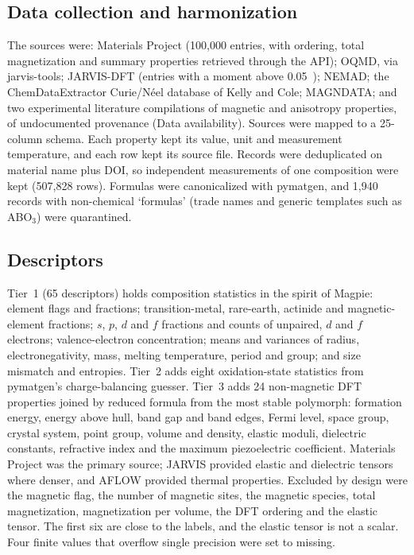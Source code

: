\documentclass[11pt,a4paper]{article}
\begin{document}
\subsection*{Data collection and harmonization}
The sources were: Materials Project\cite{jain2013materials} (100,000 entries, with ordering, total magnetization and summary properties retrieved through the API); OQMD\cite{saal2013oqmd,kirklin2015oqmd}, via jarvis-tools; JARVIS-DFT\cite{choudhary2020jarvis} (entries with a moment above 0.05~\muB{}); NEMAD\cite{itani2025nemad}; the ChemDataExtractor Curie/N\'eel database of Kelly and Cole\cite{kelly2025curie}; MAGNDATA\cite{gallego2016magndata,gallego2016magndata2}; and two experimental literature compilations of magnetic and anisotropy properties, of undocumented provenance (Data availability). Sources were mapped to a 25-column schema. Each property kept its value, unit and measurement temperature, and each row kept its source file. Records were deduplicated on material name plus DOI, so independent measurements of one composition were kept (507,828 rows). Formulas were canonicalized with pymatgen\cite{ong2013pymatgen}, and 1,940 records with non-chemical `formulas' (trade names and generic templates such as ABO$_3$) were quarantined.

\subsection*{Descriptors}
Tier~1 (65 descriptors) holds composition statistics in the spirit of Magpie\cite{ward2016magpie}: element flags and fractions; transition-metal, rare-earth, actinide and magnetic-element fractions; $s$, $p$, $d$ and $f$ fractions and counts of unpaired, $d$ and $f$ electrons; valence-electron concentration; means and variances of radius, electronegativity, mass, melting temperature, period and group; and size mismatch and entropies. Tier~2 adds eight oxidation-state statistics from pymatgen's charge-balancing guesser. Tier~3 adds 24 non-magnetic DFT properties joined by reduced formula from the most stable polymorph: formation energy, energy above hull, band gap and band edges, Fermi level, space group, crystal system, point group, volume and density, elastic moduli, dielectric constants, refractive index and the maximum piezoelectric coefficient. Materials Project was the primary source; JARVIS provided elastic and dielectric tensors where denser, and AFLOW\cite{curtarolo2012aflow} provided thermal properties. Excluded by design were the magnetic flag, the number of magnetic sites, the magnetic species, total magnetization, magnetization per volume, the DFT ordering and the elastic tensor. The first six are close to the labels, and the elastic tensor is not a scalar. Four finite values that overflow single precision were set to missing.
\end{document}
